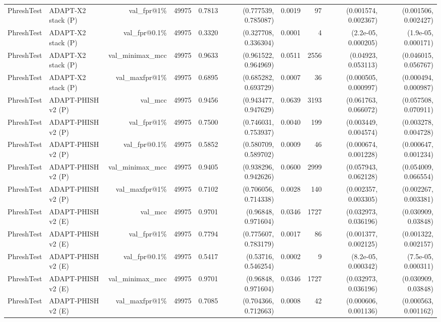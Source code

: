 \begin{table}[t]
\begin{tabular}{llrrrrrrrr}
PhreshTest & ADAPT-X2 stack (P) & val\_fpr@1\% & 49975 & 0.7813 & (0.777539, 0.785087) & 0.0019 & 97 & (0.001574, 0.002367) & (0.001506, 0.002427) \\
PhreshTest & ADAPT-X2 stack (P) & val\_fpr@0.1\% & 49975 & 0.3320 & (0.327708, 0.336304) & 0.0001 & 4 & (2.2e-05, 0.000205) & (1.9e-05, 0.000171) \\
PhreshTest & ADAPT-X2 stack (P) & val\_minimax\_mcc & 49975 & 0.9633 & (0.961522, 0.964969) & 0.0511 & 2556 & (0.04923, 0.053113) & (0.046015, 0.056767) \\
PhreshTest & ADAPT-X2 stack (P) & val\_maxfpr@1\% & 49975 & 0.6895 & (0.685282, 0.693729) & 0.0007 & 36 & (0.000505, 0.000997) & (0.000494, 0.000987) \\
PhreshTest & ADAPT-PHISH v2 (P) & val\_mcc & 49975 & 0.9456 & (0.943477, 0.947629) & 0.0639 & 3193 & (0.061763, 0.066072) & (0.057508, 0.070911) \\
PhreshTest & ADAPT-PHISH v2 (P) & val\_fpr@1\% & 49975 & 0.7500 & (0.746031, 0.753937) & 0.0040 & 199 & (0.003449, 0.004574) & (0.003278, 0.004728) \\
PhreshTest & ADAPT-PHISH v2 (P) & val\_fpr@0.1\% & 49975 & 0.5852 & (0.580709, 0.589702) & 0.0009 & 46 & (0.000674, 0.001228) & (0.000647, 0.001234) \\
PhreshTest & ADAPT-PHISH v2 (P) & val\_minimax\_mcc & 49975 & 0.9405 & (0.938296, 0.942626) & 0.0600 & 2999 & (0.057943, 0.062128) & (0.054009, 0.066554) \\
PhreshTest & ADAPT-PHISH v2 (P) & val\_maxfpr@1\% & 49975 & 0.7102 & (0.706056, 0.714338) & 0.0028 & 140 & (0.002357, 0.003305) & (0.002267, 0.003381) \\
PhreshTest & ADAPT-PHISH v2 (E) & val\_mcc & 49975 & 0.9701 & (0.96848, 0.971604) & 0.0346 & 1727 & (0.032973, 0.036196) & (0.030909, 0.03848) \\
PhreshTest & ADAPT-PHISH v2 (E) & val\_fpr@1\% & 49975 & 0.7794 & (0.775607, 0.783179) & 0.0017 & 86 & (0.001377, 0.002125) & (0.001322, 0.002157) \\
PhreshTest & ADAPT-PHISH v2 (E) & val\_fpr@0.1\% & 49975 & 0.5417 & (0.53716, 0.546254) & 0.0002 & 9 & (8.2e-05, 0.000342) & (7.5e-05, 0.000311) \\
PhreshTest & ADAPT-PHISH v2 (E) & val\_minimax\_mcc & 49975 & 0.9701 & (0.96848, 0.971604) & 0.0346 & 1727 & (0.032973, 0.036196) & (0.030909, 0.03848) \\
PhreshTest & ADAPT-PHISH v2 (E) & val\_maxfpr@1\% & 49975 & 0.7085 & (0.704366, 0.712663) & 0.0008 & 42 & (0.000606, 0.001136) & (0.000563, 0.001162) \\

\end{tabular}
\end{table}
